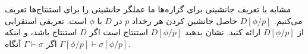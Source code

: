مشابه با تعریف جانشینی برای گزاره‌ها ما عملگر جانشینی را برای استنتاج‌ها تعریف می‌کنیم.
$D[\phi/p]$
حاصل جانشین کردن هر رخداد $p$ در $D$ با $\phi$ است.
تعریفی استقرایی از
$D[\phi/p]$
ارائه کنید. نشان بدهید
$D[\phi/p]$
استنتاج است اگر
$D$
استنتاج باشد، و اینکه اگر
$\Gamma\vdash\sigma$
آنگاه
$\Gamma[\phi/p]\vdash\sigma[\phi/p]$.